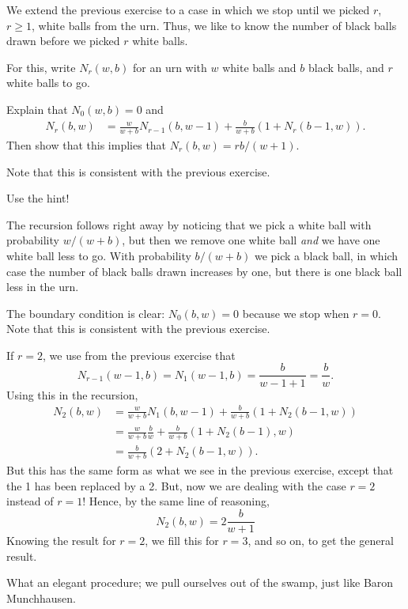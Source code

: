 \begin{exercise}
We extend the previous exercise to a case in which we stop until we picked $r$, $r\geq 1$, white balls from the urn. Thus, we like to know the number of black balls drawn before we picked $r$ white balls.

For this, write $N_{r}(w,b)$ for an urn with $w$ white balls and $b$ black balls, and $r$ white balls to go.
\begin{hint}
Explain that $N_{0}(w,b) = 0$ and
\begin{align}
  N_r(b,w) &= \frac{w}{w+b} N_{r-1}(b,w-1) +  \frac{b}{w+b} (1+N_{r}( b-1, w)).
\end{align}
Then show that this implies that $N_{r}(b, w) = r b/ (w+1)$.

Note that this is consistent with the previous exercise.

\end{hint}
\begin{solution}
Use the hint!

The recursion follows right away by noticing that we pick a white ball with probability $w/(w+b)$, but then we remove one white ball \emph{and} we have one white ball less to go.
With probability $b/(w+b)$ we pick a black ball, in which case the number of black balls drawn increases by one, but there is one black ball less in the urn.

The boundary condition is clear: $N_{0}(b,w)=0$ because we stop when $r=0$.
Note that this is consistent with the previous exercise.

If $r=2$, we use from the previous exercise that
\begin{equation*}
N_{r-1}(w-1, b) = N_{1}(w-1, b) = \frac{b }{w-1 + 1} = \frac{b }{w}.
\end{equation*}
Using this in the recursion,
\begin{align*}
  N_2(b,w)
&= \frac{w}{w+b} N_{1}(b, w-1) +  \frac{b}{w+b} (1+N_{2}(b-1,w)) \\
&= \frac{w}{w+b} \frac{b }{w} +  \frac{b}{w+b} (1+N_{2}(b-1), w) \\
&=  \frac{b}{w+b} (2+N_{2}(b-1, w)).
\end{align*}
But this has the same form as what we see in the previous exercise, except that the 1 has been replaced by a 2. But, now we are dealing with the case $r=2$ instead of $r=1$! Hence, by the same line of reasoning,
\begin{equation*}
  N_2(b,w) = 2 \frac{b}{w+1}
\end{equation*}
Knowing the result for $r=2$, we fill this for $r=3$, and so on, to get the general result.

What an elegant procedure;  we pull ourselves out of the swamp, just like Baron Munchhausen.
\end{solution}
\end{exercise}


